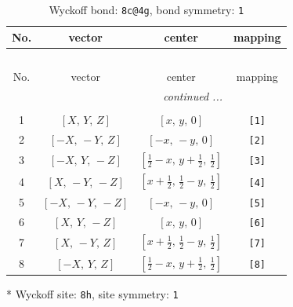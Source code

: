 \documentclass[fleqn,8pt]{jsarticle}
\begin{document}
\renewcommand{\arraystretch}{1.2}
\begin{longtable}{cccc}
\caption{Wyckoff bond: {\tt 8c@4g}, bond symmetry: {\tt 1}}
 \\
 \hline \hline
No. & vector & center & mapping \\ \hline \endfirsthead

\multicolumn{3}{l}{\tablename\ \thetable{}} \\
 \hline \hline
No. & vector & center & mapping \\ \hline \endhead

 \hline \hline
\multicolumn{3}{r}{\footnotesize\it continued ...} \\ \endfoot

 \hline \hline
\multicolumn{3}{r}{} \\ \endlastfoot

1 & $\left[ X,\, Y,\, Z \right]$ & $\left[ x,\, y,\, 0 \right]$ & {\tt [1]} \\ \hline
2 & $\left[ - X,\, - Y,\, Z \right]$ & $\left[ - x,\, - y,\, 0 \right]$ & {\tt [2]} \\ \hline
3 & $\left[ - X,\, Y,\, - Z \right]$ & $\left[ \frac{1}{2} - x,\, y + \frac{1}{2},\, \frac{1}{2} \right]$ & {\tt [3]} \\ \hline
4 & $\left[ X,\, - Y,\, - Z \right]$ & $\left[ x + \frac{1}{2},\, \frac{1}{2} - y,\, \frac{1}{2} \right]$ & {\tt [4]} \\ \hline
5 & $\left[ - X,\, - Y,\, - Z \right]$ & $\left[ - x,\, - y,\, 0 \right]$ & {\tt [5]} \\ \hline
6 & $\left[ X,\, Y,\, - Z \right]$ & $\left[ x,\, y,\, 0 \right]$ & {\tt [6]} \\ \hline
7 & $\left[ X,\, - Y,\, Z \right]$ & $\left[ x + \frac{1}{2},\, \frac{1}{2} - y,\, \frac{1}{2} \right]$ & {\tt [7]} \\ \hline
8 & $\left[ - X,\, Y,\, Z \right]$ & $\left[ \frac{1}{2} - x,\, y + \frac{1}{2},\, \frac{1}{2} \right]$ & {\tt [8]} \\
\end{longtable}
* Wyckoff site: {\tt 8h}, site symmetry: {\tt 1}
\renewcommand{\arraystretch}{1.2}
\end{document}
